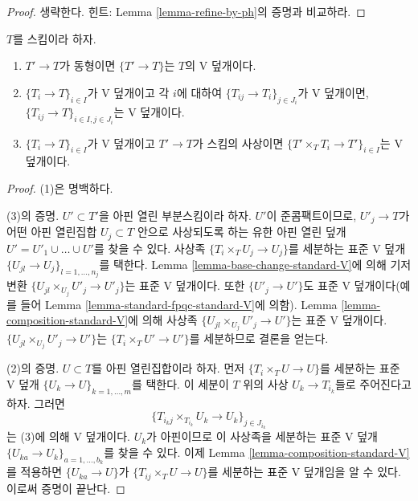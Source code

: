 \begin{proof}
생략한다. 힌트: Lemma \ref{lemma-refine-by-ph}의 증명과 비교하라.
\end{proof}

\begin{lemma}
\label{lemma-V}
$T$를 스킴이라 하자.
\begin{enumerate}
\item $T' \to T$가 동형이면 $\{T' \to T\}$는 $T$의 V 덮개이다.
\item $\{T_i \to T\}_{i\in I}$가 V 덮개이고 각 $i$에 대하여
$\{T_{ij} \to T_i\}_{j\in J_i}$가 V 덮개이면,
$\{T_{ij} \to T\}_{i \in I, j\in J_i}$는 V 덮개이다.
\item $\{T_i \to T\}_{i\in I}$가 V 덮개이고 $T' \to T$가 스킴의
사상이면 $\{T' \times_T T_i \to T'\}_{i\in I}$는 V 덮개이다.
\end{enumerate}
\end{lemma}

\begin{proof}
(1)은 명백하다.

\medskip\noindent
(3)의 증명. $U' \subset T'$을 아핀 열린 부분스킴이라 하자. $U'$이
준콤팩트이므로, $U'_j \to T$가 어떤 아핀 열린집합 $U_j \subset T$ 안으로
사상되도록 하는 유한 아핀 열린 덮개
$U' = U'_1 \cup \ldots \cup U'$를 찾을 수 있다. 사상족
$\{T_i \times_T U_j \to U_j\}$를 세분하는 표준 V 덮개
$\{U_{jl} \to U_j\}_{l = 1, \ldots, n_j}$를 택한다. Lemma
\ref{lemma-base-change-standard-V}에 의해 기저변환
$\{U_{jl} \times_{U_j} U'_j \to U'_j\}$는 표준 V 덮개이다. 또한
$\{U'_j \to U'\}$도 표준 V 덮개이다(예를 들어 Lemma
\ref{lemma-standard-fpqc-standard-V}에 의함). Lemma
\ref{lemma-composition-standard-V}에 의해 사상족
$\{U_{jl} \times_{U_j} U'_j \to U'\}$는 표준 V 덮개이다.
$\{U_{jl} \times_{U_j} U'_j \to U'\}$는
$\{T_i \times_T U' \to U'\}$를 세분하므로 결론을 얻는다.

\medskip\noindent
(2)의 증명. $U \subset T$를 아핀 열린집합이라 하자. 먼저
$\{T_i \times_T U \to U\}$를 세분하는 표준 V 덮개
$\{U_k \to U\}_{k = 1, \ldots, m}$를 택한다. 이 세분이 $T$ 위의 사상
$U_k \to T_{i_k}$들로 주어진다고 하자. 그러면
$$
\{T_{i_kj} \times_{T_{i_k}} U_k \to U_k\}_{j \in J_{i_k}}
$$
는 (3)에 의해 V 덮개이다. $U_k$가 아핀이므로 이 사상족을 세분하는 표준
V 덮개 $\{U_{ka} \to U_k\}_{a = 1, \ldots, b_k}$를 찾을 수 있다. 이제
Lemma \ref{lemma-composition-standard-V}를 적용하면
$\{U_{ka} \to U\}$가 $\{T_{ij} \times_T U \to U\}$를 세분하는 표준 V
덮개임을 알 수 있다. 이로써 증명이 끝난다.
\end{proof}

